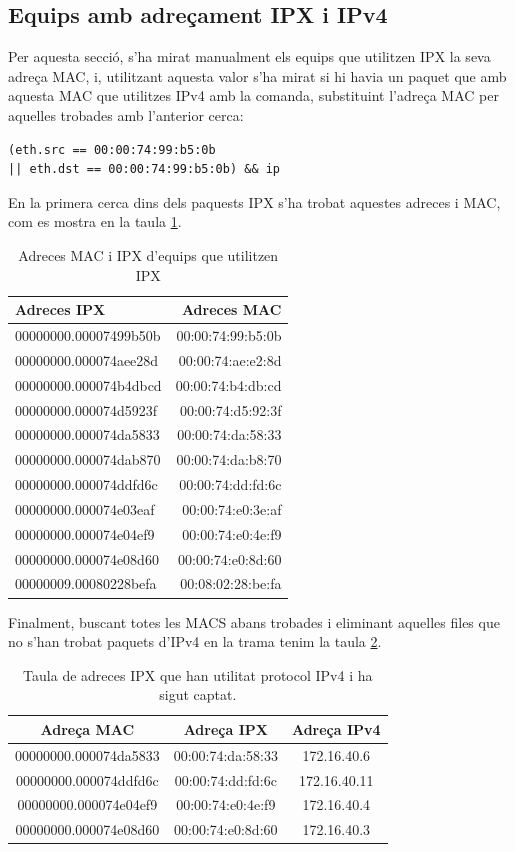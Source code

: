 \documentclass{article}
\begin{document}
\subsection{Equips amb adreçament IPX i IPv4}
Per aquesta secció, s'ha mirat manualment els equips que utilitzen IPX 
la seva adreça MAC, i, utilitzant aquesta valor s'ha mirat si hi havia un 
paquet que amb aquesta MAC que utilitzes IPv4 amb la comanda, substituint
l'adreça MAC per aquelles trobades amb l'anterior cerca:\\
\begin{lstlisting}
(eth.src == 00:00:74:99:b5:0b 
|| eth.dst == 00:00:74:99:b5:0b) && ip
\end{lstlisting}
En la primera cerca dins dels paquests IPX s'ha trobat aquestes adreces i MAC,
com es mostra en la taula \ref{ipx:mac}.
\begin{table}[!h]
\centering
\begin{tabular}{|l|r|}
\hline
Adreces IPX &Adreces MAC\\
\hline
00000000.00007499b50b &00:00:74:99:b5:0b\\
\hline
00000000.000074aee28d &00:00:74:ae:e2:8d\\
\hline
00000000.000074b4dbcd &00:00:74:b4:db:cd\\
\hline
00000000.000074d5923f &00:00:74:d5:92:3f\\
\hline
00000000.000074da5833 &00:00:74:da:58:33\\
\hline
00000000.000074dab870 &00:00:74:da:b8:70\\
\hline
00000000.000074ddfd6c &00:00:74:dd:fd:6c\\
\hline
00000000.000074e03eaf &00:00:74:e0:3e:af\\
\hline
00000000.000074e04ef9 &00:00:74:e0:4e:f9\\
\hline
00000000.000074e08d60 &00:00:74:e0:8d:60\\
\hline
00000009.00080228befa &00:08:02:28:be:fa\\
\hline
\end{tabular}
\caption{Adreces MAC i IPX d'equips que utilitzen IPX}
\label{ipx:mac}
\end{table}
Finalment, buscant totes les MACS abans trobades i eliminant aquelles 
files que no s'han trobat paquets d'IPv4 en la trama tenim la taula \ref{ipx:ipv4}.
\begin{table}[!h]
\centering
\begin{tabular}{ |c|c|c| }
\hline
Adreça MAC &Adreça IPX &Adreça IPv4\\
\hline
00000000.000074da5833 &00:00:74:da:58:33 &172.16.40.6\\
\hline
00000000.000074ddfd6c &00:00:74:dd:fd:6c &172.16.40.11\\
\hline
00000000.000074e04ef9 &00:00:74:e0:4e:f9 &172.16.40.4\\
\hline
00000000.000074e08d60 &00:00:74:e0:8d:60 &172.16.40.3\\
\hline
\end{tabular}
\caption{Taula de adreces IPX que han utilitat protocol IPv4 i ha sigut captat.}
\label{ipx:ipv4}
\end{table}
\end{document}
